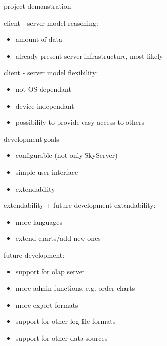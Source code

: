 \documentclass[xcolor=dvipsnames]{beamer}
\begin{document}
\begin{frame}{}
	\begin{center}
	\huge{project demonstration}
	\end{center}
\end{frame}  

\begin{frame}{client - server model}
	reasoning:
	\begin{itemize}
	  \item<2-> amount of data
	  \item<3-> already present server infrastructure, most likely
	\end{itemize}
\end{frame}

\begin{frame}{client - server model}
	flexibility:
	\begin{itemize}
	  \item<2-> not OS dependant
	  \item<3-> device independant %
	  \item<4-> possibility to provide easy access to others
	\end{itemize}
\end{frame}

\begin{frame}{development goals}
	\begin{itemize}
	  \item<1-> configurable (not only SkyServer)
	  \item<2-> simple user interface
	  \item<3-> extendability
	\end{itemize}
\end{frame}

\begin{frame}{extendability + future development}
	extendability:
	\begin{itemize}
	  \item<2-> more languages
	  \item<3-> extend charts/add new ones
	\end{itemize}
	 {future development:}
	\begin{itemize}
	  \item<5-> support for olap server
	  \item<6-> more admin functions, e.g. order charts
	  \item<7-> more export formats
	  \item<8-> support for other log file formats
	  \item<9-> support for other data sources
	\end{itemize}
\end{frame}
\end{document}
